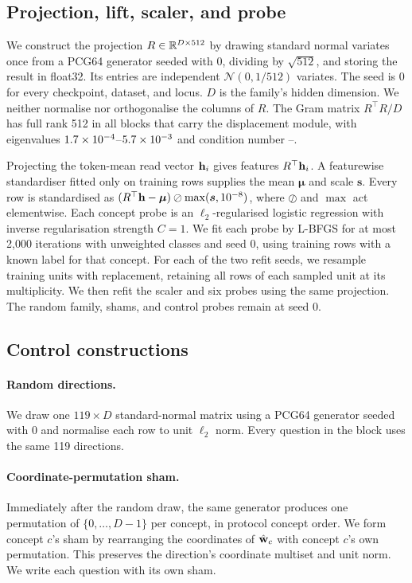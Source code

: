 \documentclass{article}
\begin{document}
\subsection{Projection, lift, scaler, and probe}
\label{app:repro-probe}

We construct the projection $R\in\mathbb{R}^{D\times512}$ by drawing standard normal variates once from a PCG64 generator seeded with $0$, dividing by $\sqrt{512}$, and storing the result in float32. Its entries are independent $\mathcal{N}(0,1/512)$ variates. The seed is $0$ for every checkpoint, dataset, and locus. $D$ is the family's hidden dimension. We neither normalise nor orthogonalise the columns of $R$. The Gram matrix $R^{\top}R/D$ has full rank 512 in all \cfAltdirdBlocks{} blocks that carry the displacement module, with eigenvalues $1.7\times10^{-4}$--$5.7\times10^{-3}$ and condition number \cfAltdirdCondMin{}--\cfAltdirdCondMax{}.

Projecting the token-mean read vector $\mathbf{h}_i$ gives features $R^{\top}\mathbf{h}_i$. A featurewise standardiser fitted only on training rows supplies the mean $\boldsymbol\mu$ and scale $\boldsymbol s$. Every row is standardised as $(R^{\top}\mathbf{h}-\boldsymbol\mu)\oslash\max(\boldsymbol s,10^{-8})$, where $\oslash$ and $\max$ act elementwise. Each concept probe is an $\ell_2$-regularised logistic regression with inverse regularisation strength $C=1$. We fit each probe by L-BFGS for at most 2{,}000 iterations with unweighted classes and seed $0$, using training rows with a known label for that concept. For each of the two refit seeds, we resample training units with replacement, retaining all rows of each sampled unit at its multiplicity. We then refit the scaler and six probes using the same projection. The random family, shams, and control probes remain at seed 0.

\subsection{Control constructions}
\label{app:repro-controls}

\paragraph{Random directions.} We draw one $119\times D$ standard-normal matrix using a PCG64 generator seeded with $0$ and normalise each row to unit $\ell_2$ norm. Every question in the block uses the same 119 directions.

\paragraph{Coordinate-permutation sham.} Immediately after the random draw, the same generator produces one permutation of $\{0,\dots,D{-}1\}$ per concept, in protocol concept order. We form concept $c$'s sham by rearranging the coordinates of $\hat{\mathbf{w}}_c$ with concept $c$'s own permutation. This preserves the direction's coordinate multiset and unit norm. We write each question with its own sham.
\end{document}
